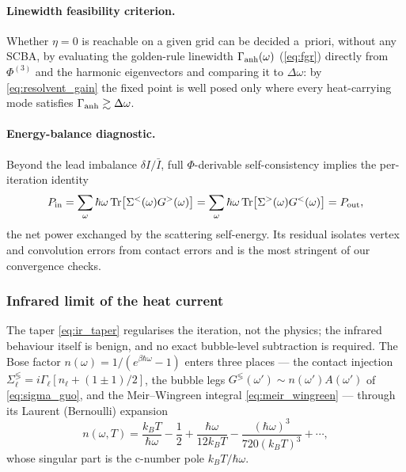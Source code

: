 \paragraph{Linewidth feasibility criterion.}
Whether $\eta=0$ is reachable on a given grid can be decided a~priori, without any
SCBA, by evaluating the golden-rule linewidth $\Gamma_{\rm anh}(\omega)$
(\cref{eq:fgr}) directly from $\Phi^{(3)}$ and the harmonic eigenvectors and
comparing it to $\Delta\omega$: by \cref{eq:resolvent_gain} the fixed point is
well posed only where every heat-carrying mode satisfies
$\Gamma_{\rm anh}\gtrsim\Delta\omega$.

\paragraph{Energy-balance diagnostic.}
Beyond the lead imbalance $\delta I/\bar I$, full $\Phi$-derivable
self-consistency implies the per-iteration identity
\begin{equation}\label{eq:bubble_balance}
  P_{\rm in}=\sum_\omega\hbar\omega\,
   \mathrm{Tr}\bigl[\Sigma^<(\omega)G^>(\omega)\bigr]
  =\sum_\omega\hbar\omega\,
   \mathrm{Tr}\bigl[\Sigma^>(\omega)G^<(\omega)\bigr]=P_{\rm out},
\end{equation}
the net power exchanged by the scattering self-energy. Its residual isolates
vertex and convolution errors from contact errors and is the most stringent of
our convergence checks.

\subsubsection{Infrared limit of the heat current}
\label{sub:ir_subtraction}

The taper \cref{eq:ir_taper} regularises the iteration, not the physics; the
infrared behaviour itself is benign, and no exact bubble-level subtraction is
required. The Bose factor $n(\omega)=1/(e^{\beta\hbar\omega}-1)$ enters three
places --- the contact injection
$\Sigma_\ell^{\lessgtr}=i\Gamma_\ell[n_\ell+(1{\pm}1)/2]$, the bubble legs
$G^{\lessgtr}(\omega')\sim n(\omega')A(\omega')$ of \cref{eq:sigma_guo}, and the
Meir--Wingreen integral \cref{eq:meir_wingreen} --- through its Laurent (Bernoulli)
expansion
\begin{equation}\label{eq:bose_laurent}
  n(\omega,T)=\frac{k_BT}{\hbar\omega}-\frac12+\frac{\hbar\omega}{12k_BT}
  -\frac{(\hbar\omega)^3}{720(k_BT)^3}+\cdots,
\end{equation}
whose singular part is the c-number pole $k_BT/\hbar\omega$.

